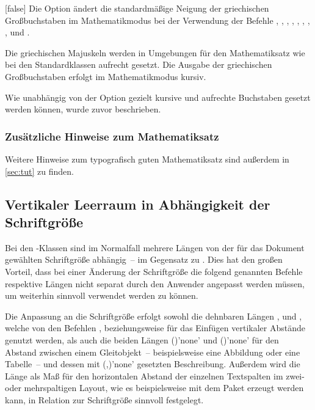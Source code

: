 \begin{Declaration*}{}
\begin{Declaration*}{}
\begin{Declaration*}{}
\begin{Declaration}{}[false]
\printdeclarationlist%
%
Die Option ändert die standardmäßige Neigung der griechischen Großbuchstaben im 
Mathematikmodus bei der Verwendung der Befehle , , 
, , , , , 
,  und .
%
\begin{values}{}
\itemfalse
  Die griechischen Majuskeln werden in Umgebungen für den Mathematiksatz wie 
  bei den Standardklassen aufrecht gesetzt.
\itemtrue*
  Die Ausgabe der griechischen Großbuchstaben erfolgt im Mathematikmodus kursiv.
\end{values}
%
Wie unabhängig von der Option  gezielt kursive und 
aufrechte Buchstaben gesetzt werden können, wurde zuvor  
beschrieben.
%
\end{Declaration}


\subsubsection{Zusätzliche Hinweise zum Mathematiksatz}
Weitere Hinweise zum typografisch guten Mathematiksatz sind außerdem in 
\autoref{sec:tut} zu finden.
%


\subsection{Vertikaler Leerraum in Abhängigkeit der Schriftgröße}
%
%
%
Bei den \TUDScript-Klassen sind im Normalfall mehrere Längen von der für das 
Dokument gewählten Schriftgröße abhängig~-- im Gegensatz zu \KOMAScript. Dies 
hat den großen Vorteil, dass bei einer Änderung der Schriftgröße die folgend 
genannten Befehle respektive Längen nicht separat durch den Anwender angepasst 
werden müssen, um weiterhin sinnvoll verwendet werden zu können.

Die Anpassung an die Schriftgröße erfolgt sowohl die dehnbaren Längen 
,  und , 
welche von den Befehlen ,  beziehungsweise 
 für das Einfügen vertikaler Abstände genutzt werden, als auch 
die beiden Längen ()'none' und 
()'none' für den Abstand zwischen 
einem Gleitobjekt~-- beispielsweise eine Abbildung oder eine Tabelle~-- und 
dessen mit (,)'none' 
gesetzten Beschreibung. Außerdem wird die Länge  als Maß für 
den horizontalen Abstand der einzelnen Textspalten im zwei- oder mehrspaltigen 
Layout, wie es beispielsweise mit dem Paket  erzeugt werden 
kann, in Relation zur Schriftgröße sinnvoll festgelegt.


\end{Declaration*}
\end{Declaration*}
\end{Declaration*}
